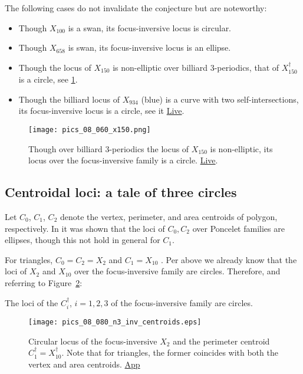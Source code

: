 The following cases do not invalidate the conjecture but are noteworthy:

\begin{itemize}
    \item Though $X_{100}$ is a swan, its focus-inversive locus is circular.
    \item Though $X_{658}$ is swan, its focus-inversive locus is an ellipse.
    \item Though the locus of $X_{150}$ is non-elliptic over billiard 3-periodics, that of $X_{150}^\dagger$ is a circle, see \cref{fig:08-x150}.
    \item Though the billiard locus of $X_{934}$ (blue) is a curve with two self-intersections, its focus-inversive locus is a circle, see it \href{https://bit.ly/3fUicrY}{Live}.
\end{itemize}


\begin{figure}
    \centering
    \texttt{[image: pics\_08\_060\_x150.png]}
    \caption{Though over billiard 3-periodics the locus of $X_{150}$ is non-elliptic, its locus over the focus-inversive family is a circle. \href{https://bit.ly/34v5Pgz}{Live}.}
    \label{fig:08-x150}
\end{figure}

\subsection{Centroidal loci: a tale of three circles}

Let $C_0$, $C_1$, $C_2$ denote the vertex, perimeter, and area centroids of polygon, respectively. In \cite[Thm 1]{schwartz2016-com} it was shown that the loci of $C_0,C_2$ over Poncelet families are ellipses, though this not hold in general for $C_1$.

For triangles, $C_0=C_2=X_2$ and $C_1=X_{10}$ \cite[Spieker Center]{mw}. Per above we already know that the loci of $X_{2}$ and $X_{10}$ over the focus-inversive family are circles. Therefore, and referring to Figure~\ref{fig:n3-centroids}:

\begin{corollary}
The loci of the $C_i^\dagger$, $i=1,2,3$ of the focus-inversive family are circles.
\end{corollary}

\begin{figure}
    \centering
    \texttt{[image: pics\_08\_080\_n3\_inv\_centroids.eps]}
    \caption{Circular locus of the focus-inversive $X_2$ and the perimeter centroid $C_1^\dagger=X_{10}^\dagger$. Note that for triangles, the former coincides with both the vertex and area centroids. \href{https://bit.ly/3kYnGlP}{App}}
    \label{fig:n3-centroids}
\end{figure}

